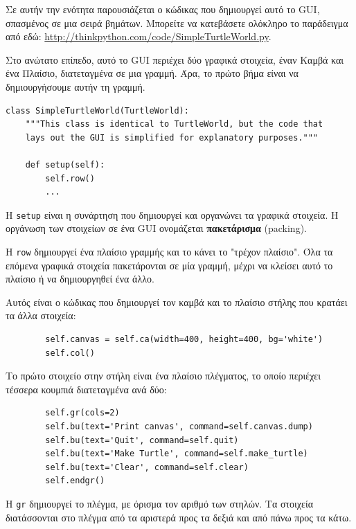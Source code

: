 \documentclass[10pt]{book}
\begin{document}
Σε αυτήν την ενότητα παρουσιάζεται ο κώδικας που δημιουργεί αυτό το GUI, σπασμένος σε μια σειρά βημάτων.
Μπορείτε να κατεβάσετε ολόκληρο το παράδειγμα από εδώ: \url{http://thinkpython.com/code/SimpleTurtleWorld.py}.

Στο ανώτατο επίπεδο, αυτό το GUI περιέχει δύο γραφικά στοιχεία, έναν Καμβά και ένα Πλαίσιο, διατεταγμένα σε
μια γραμμή.  Άρα, το πρώτο βήμα είναι να δημιουργήσουμε αυτήν τη γραμμή.   

\begin{verbatim}
class SimpleTurtleWorld(TurtleWorld):
    """This class is identical to TurtleWorld, but the code that
    lays out the GUI is simplified for explanatory purposes."""

    def setup(self):
        self.row()
        ...
\end{verbatim}
%
Η {\tt setup} είναι η συνάρτηση που δημιουργεί και οργανώνει τα γραφικά στοιχεία. 
Η οργάνωση των στοιχείων σε ένα GUI ονομάζεται {\bf πακετάρισμα} (packing).

Η {\tt row} δημιουργεί ένα πλαίσιο γραμμής και το κάνει το "τρέχον πλαίσιο".
Όλα τα επόμενα γραφικά στοιχεία πακετάρονται σε μία γραμμή, μέχρι να κλείσει αυτό το πλαίσιο
ή να δημιουργηθεί ένα άλλο.

Αυτός είναι ο κώδικας που δημιουργεί τον καμβά και το πλαίσιο στήλης που κρατάει τα 
άλλα στοιχεία:

\begin{verbatim}
        self.canvas = self.ca(width=400, height=400, bg='white')
        self.col()
\end{verbatim}
%
Το πρώτο στοιχείο στην στήλη είναι ένα πλαίσιο πλέγματος, το οποίο περιέχει τέσσερα 
κουμπιά διατεταγμένα ανά δύο:

\begin{verbatim}
        self.gr(cols=2)
        self.bu(text='Print canvas', command=self.canvas.dump)
        self.bu(text='Quit', command=self.quit)
        self.bu(text='Make Turtle', command=self.make_turtle)
        self.bu(text='Clear', command=self.clear)
        self.endgr()
\end{verbatim}
%
Η {\tt gr} δημιουργεί το πλέγμα, με όρισμα τον αριθμό των στηλών.  
Τα στοιχεία διατάσσονται στο πλέγμα από τα αριστερά προς τα δεξιά και από πάνω προς τα κάτω.
\end{document}
